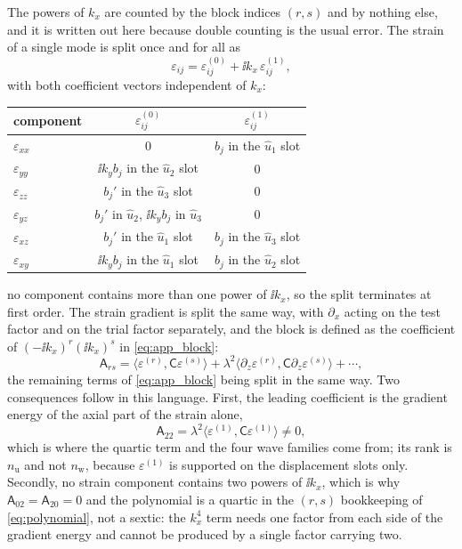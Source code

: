 The powers of $k_x$ are counted by the block indices $(r,s)$ and by nothing else,
and it is written out here because double counting is the usual error.
The strain of a single mode is split once and for all as
\begin{equation}
\label{eq:app_strain_split}
\varepsilon_{ij}=\varepsilon^{(0)}_{ij}+\ii k_x\,\varepsilon^{(1)}_{ij},
\end{equation}
with both coefficient vectors independent of $k_x$:
\begin{center}
\renewcommand{\arraystretch}{1.1}
\begin{tabular}{@{}lcc@{}}
\toprule
component & $\varepsilon^{(0)}_{ij}$ & $\varepsilon^{(1)}_{ij}$ \\
\midrule
$\varepsilon_{xx}$ & $0$ & $b_j$ in the $\widehat u_1$ slot \\
$\varepsilon_{yy}$ & $\ii k_yb_j$ in the $\widehat u_2$ slot & $0$ \\
$\varepsilon_{zz}$ & $b_j'$ in the $\widehat u_3$ slot & $0$ \\
$\varepsilon_{yz}$ & $b_j'$ in $\widehat u_2$, $\ii k_yb_j$ in $\widehat u_3$ & $0$ \\
$\varepsilon_{xz}$ & $b_j'$ in the $\widehat u_1$ slot & $b_j$ in the $\widehat u_3$ slot \\
$\varepsilon_{xy}$ & $\ii k_yb_j$ in the $\widehat u_1$ slot & $b_j$ in the $\widehat u_2$ slot \\
\bottomrule
\end{tabular}
\end{center}
no component contains more than one power of $\ii k_x$, so the split terminates at
first order.  The strain gradient is split the same way, with $\partial_x$ acting
on the test factor and on the trial factor separately, and the block is defined as
the coefficient of $(-\ii k_x)^{r}(\ii k_x)^{s}$ in \eqref{eq:app_block}:
\begin{equation}
\label{eq:app_ar_s}
\mathsf A_{rs}=\bigl\langle\varepsilon^{(r)},\mathsf C\varepsilon^{(s)}\bigr\rangle
+\lambda^{2}\bigl\langle\partial_z\varepsilon^{(r)},\mathsf C\partial_z\varepsilon^{(s)}\bigr\rangle
+\cdots ,
\end{equation}
the remaining terms of \eqref{eq:app_block} being split in the same way.  Two consequences follow in this language.  First, the leading coefficient
is the gradient energy of the axial part of the strain alone,
\begin{equation}
\label{eq:app_A22}
\mathsf A_{22}=\lambda^{2}\bigl\langle\varepsilon^{(1)},\mathsf C\varepsilon^{(1)}\bigr\rangle
\neq0 ,
\end{equation}
which is where the quartic term and the four wave families come from; its rank is $n_{\mathrm u}$ and not $n_{\mathrm w}$, because $\varepsilon^{(1)}$ is
supported on the displacement slots only.  Secondly, no strain component contains
two powers of $\ii k_x$, which is why $\mathsf A_{02}=\mathsf A_{20}=0$ and the polynomial is a quartic in the $(r,s)$ bookkeeping of \eqref{eq:polynomial}, not a sextic: the
$k_x^{4}$ term needs one factor from each side of the gradient energy and cannot
be produced by a single factor carrying two.

